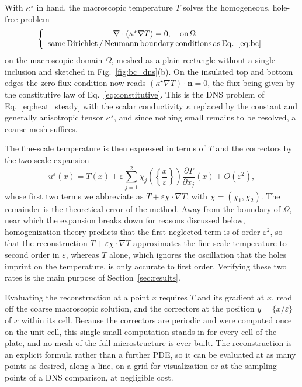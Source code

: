 \documentclass{article}
\newcommand{\tmop}[1]{\ensuremath{\operatorname{#1}}}
\begin{document}
With $\kappa^{\star}$ in hand, the macroscopic temperature $T$ solves the
homogeneous, hole-free problem
\begin{equation}
  \label{eq:macro_problem}
  \left\{ \begin{array}{c}
    \nabla \cdot \left( \kappa^{\star} \nabla T \right) = 0, \quad \tmop{on}
    \Omega \\
    \tmop{same} \tmop{Dirichlet}/\tmop{Neumann} \tmop{boundary} \tmop{conditions}
    \tmop{as} \tmop{Eq.}~\eqref{eq:bc}
  \end{array} \right.
\end{equation}
on the macroscopic domain $\Omega$, meshed as a plain rectangle without a
single inclusion and sketched in Fig.~\ref{fig:bc_dns}(b). On the insulated top and
bottom edges the zero-flux condition now reads $(\kappa^{\star}\nabla T)\cdot\mathbf{n}=0$,
the flux being given by the constitutive law of Eq.~\eqref{eq:constitutive}. This is the DNS problem of Eq.~\eqref{eq:heat_steady}
with the scalar conductivity $\kappa$ replaced by the constant and generally
anisotropic tensor $\kappa^{\star}$, and since nothing small remains to be
resolved, a coarse mesh suffices.

The fine-scale temperature is then expressed in terms of $T$ and the
correctors by the two-scale expansion
\begin{equation}
  \label{eq:twoscale_ansatz}
  u^{\varepsilon} (x) = T (x) + \varepsilon \sum_{j = 1}^2 \chi_j \left( \left\{
  \frac{x}{\varepsilon} \right\} \right) \frac{\partial T}{\partial x_j} (x) + O
  (\varepsilon^2),
\end{equation}
whose first two terms we abbreviate as $T + \varepsilon \chi \cdot \nabla T$, with
$\chi = (\chi_1, \chi_2)$. The remainder is the theoretical error of the method.
Away from the boundary of $\Omega$, near which the expansion breaks down for
reasons discussed below, homogenization theory predicts that the
first neglected term is of order $\varepsilon^2$, so that the reconstruction
$T + \varepsilon \chi \cdot \nabla T$ approximates the fine-scale temperature to
second order in $\varepsilon$, whereas $T$ alone, which ignores the oscillation
that the holes imprint on the temperature, is only accurate to first order.
Verifying these two rates is the main purpose of Section~\ref{sec:results}.

Evaluating the reconstruction at a point $x$ requires $T$ and its gradient at
$x$, read off the coarse macroscopic solution, and the correctors at the
position $y = \{ x / \varepsilon \}$ of $x$ within its cell. Because the
correctors are periodic and were computed once on the unit cell, this single
small computation stands in for every cell of the plate, and no mesh of the
full microstructure is ever built. The reconstruction is an explicit formula
rather than a further PDE, so it can be evaluated at as many points as
desired, along a line, on a grid for visualization or at the sampling points
of a DNS comparison, at negligible cost.
\end{document}
